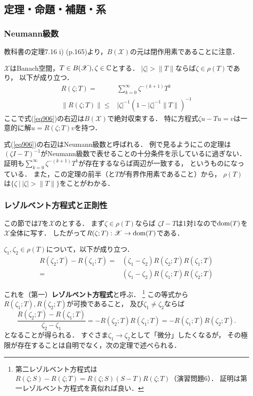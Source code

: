 \documentclass[a4j]{jsarticle}
\newcommand{\spX}{\mathscr{X}}
\begin{document}
    \subsection{定理・命題・補題・系}
    \subsubsection{Neumann級数}
    教科書の定理7.16 i) (p.165)より，$B(\spX)$の元は閉作用素であることに注意．

    \begin{Them}[定理9.2, p.209] \label{them902}
        $\spX$はBanach空間，$T \in B(\spX), \zeta \in \C$とする．
        $|\zeta| > \|T\|$ならば$\zeta \in \rho(T)$であり，
        以下が成り立つ．
        \begin{align}
            R(\zeta; T)=&\sum_{k=0}^{\infty} \zeta^{-(k+1)} T^k \label{eq906}\\
            \|R(\zeta; T)\| \leq& |\zeta|^{-1} (1-|\zeta|^{-1} \|T\|)^{-1}
        \end{align}
        ここで式(\ref{eq906})の右辺は$B(\spX)$で絶対収束する．
        特に方程式$\zeta u-Tu=v$は一意的に解$u=R(\zeta;T)v$を持つ．
    \end{Them}
    式(\ref{eq906})の右辺はNeumann級数と呼ばれる．
    例で見るようにこの定理は$(\zeta I-T)^{-1}$がNeumann級数で表せることの十分条件を示しているに過ぎない．
    証明も$\sum_{k=0}^{\infty} \zeta^{-(k+1)} T^k$が存在するならば両辺が一致する，
    というものになっている．
    また，この定理の前半（と$T$が有界作用素であること）から，
    $\rho(T)$は$\{ \zeta ~|~ |\zeta| > \|T\| \}$をことがわかる．

    \subsubsection{レゾルベント方程式と正則性}
    この節では$T$を$\spX$のとする．
    まず$\zeta \in \rho(T)$ならば
    $\zeta I-T$は1対1なので$\operatorname{dom}(T)$を$\spX$全体に写す．
    したがって$R(\zeta;T):\spX \to \dom(T)$である．

    \begin{Them}
        $\zeta_1, \zeta_2 \in \rho(T)$について，以下が成り立つ．
        \begin{align*}
            R(\zeta_2;T)-R(\zeta_1;T)
            =&(\zeta_1-\zeta_2)R(\zeta_2;T)R(\zeta_1;T) \\
            =&(\zeta_1-\zeta_2)R(\zeta_1;T)R(\zeta_2;T)
        \end{align*}
    \end{Them}
    これを（第一）\textbf{レゾルベント方程式}と呼ぶ．
    \footnote
    {
        第二レゾルベント方程式は$R(\zeta;S)-R(\zeta;T)=R(\zeta;S)(S-T)R(\zeta;T)$（演習問題6）．
        証明は第一レゾルベント方程式を真似れば良い．
    }
    この等式から$R(\zeta_1;T), R(\zeta_2;T)$が可換であること，
    及び$\zeta_1 \neq \zeta_2$ならば
    \[ \frac{R(\zeta_2;T)-R(\zeta_1;T)}{\zeta_2-\zeta_1}=-R(\zeta_2;T)R(\zeta_1;T)=-R(\zeta_1;T)R(\zeta_2;T). \label{eq-ori901} \]
    となることが得られる．
    すぐさま$\zeta_1 \to \zeta_2$として「微分」したくなるが，
    その極限が存在することは自明でなく，次の定理で述べられる．
\end{document}
